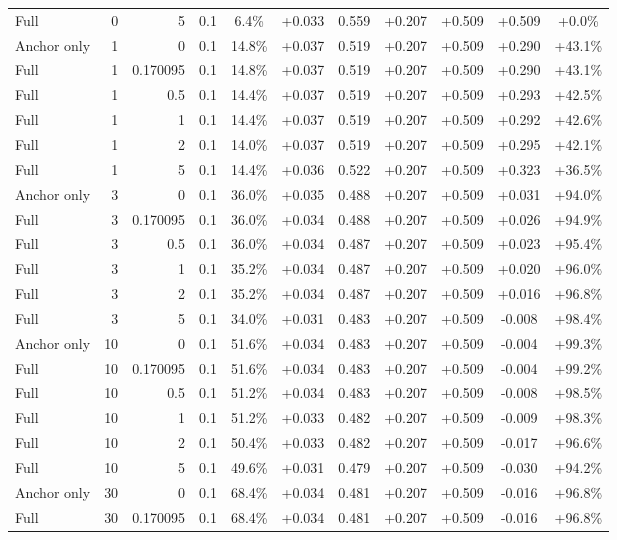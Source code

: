 \begin{table}[htbp]
\begin{tabular}{lrrrccccccc}
Full & 0 & 5 & 0.1 & 6.4\% & +0.033 & 0.559 & +0.207 & +0.509 & +0.509 & +0.0\% \\
Anchor only & 1 & 0 & 0.1 & 14.8\% & +0.037 & 0.519 & +0.207 & +0.509 & +0.290 & +43.1\% \\
Full & 1 & 0.170095 & 0.1 & 14.8\% & +0.037 & 0.519 & +0.207 & +0.509 & +0.290 & +43.1\% \\
Full & 1 & 0.5 & 0.1 & 14.4\% & +0.037 & 0.519 & +0.207 & +0.509 & +0.293 & +42.5\% \\
Full & 1 & 1 & 0.1 & 14.4\% & +0.037 & 0.519 & +0.207 & +0.509 & +0.292 & +42.6\% \\
Full & 1 & 2 & 0.1 & 14.0\% & +0.037 & 0.519 & +0.207 & +0.509 & +0.295 & +42.1\% \\
Full & 1 & 5 & 0.1 & 14.4\% & +0.036 & 0.522 & +0.207 & +0.509 & +0.323 & +36.5\% \\
Anchor only & 3 & 0 & 0.1 & 36.0\% & +0.035 & 0.488 & +0.207 & +0.509 & +0.031 & +94.0\% \\
Full & 3 & 0.170095 & 0.1 & 36.0\% & +0.034 & 0.488 & +0.207 & +0.509 & +0.026 & +94.9\% \\
Full & 3 & 0.5 & 0.1 & 36.0\% & +0.034 & 0.487 & +0.207 & +0.509 & +0.023 & +95.4\% \\
Full & 3 & 1 & 0.1 & 35.2\% & +0.034 & 0.487 & +0.207 & +0.509 & +0.020 & +96.0\% \\
Full & 3 & 2 & 0.1 & 35.2\% & +0.034 & 0.487 & +0.207 & +0.509 & +0.016 & +96.8\% \\
Full & 3 & 5 & 0.1 & 34.0\% & +0.031 & 0.483 & +0.207 & +0.509 & -0.008 & +98.4\% \\
Anchor only & 10 & 0 & 0.1 & 51.6\% & +0.034 & 0.483 & +0.207 & +0.509 & -0.004 & +99.3\% \\
Full & 10 & 0.170095 & 0.1 & 51.6\% & +0.034 & 0.483 & +0.207 & +0.509 & -0.004 & +99.2\% \\
Full & 10 & 0.5 & 0.1 & 51.2\% & +0.034 & 0.483 & +0.207 & +0.509 & -0.008 & +98.5\% \\
Full & 10 & 1 & 0.1 & 51.2\% & +0.033 & 0.482 & +0.207 & +0.509 & -0.009 & +98.3\% \\
Full & 10 & 2 & 0.1 & 50.4\% & +0.033 & 0.482 & +0.207 & +0.509 & -0.017 & +96.6\% \\
Full & 10 & 5 & 0.1 & 49.6\% & +0.031 & 0.479 & +0.207 & +0.509 & -0.030 & +94.2\% \\
Anchor only & 30 & 0 & 0.1 & 68.4\% & +0.034 & 0.481 & +0.207 & +0.509 & -0.016 & +96.8\% \\
Full & 30 & 0.170095 & 0.1 & 68.4\% & +0.034 & 0.481 & +0.207 & +0.509 & -0.016 & +96.8\% \\

\end{tabular}
\end{table}
